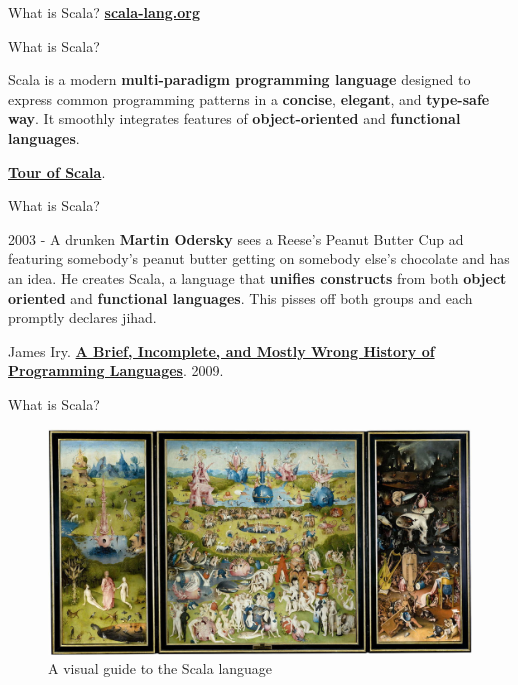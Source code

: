 \documentclass[ignorenonframetext,]{beamer}
\begin{document}
\begin{frame}[fragile]
\begin{block}{What is Scala?}
\href{https://www.scala-lang.org}{\textbf{scala-lang.org}}

\end{block}

\begin{block}{What is Scala?}

Scala is a modern \textbf{multi-paradigm programming language} designed
to express common programming patterns in a \textbf{concise},
\textbf{elegant}, and \textbf{type-safe way}. It smoothly integrates
features of \textbf{object-oriented} and \textbf{functional languages}.

\href{https://docs.scala-lang.org/tour/tour-of-scala.html}{\textbf{Tour
of Scala}}.

\end{block}

\begin{block}{What is Scala?}

2003 - A drunken \textbf{Martin Odersky} sees a Reese's Peanut Butter
Cup ad featuring somebody's peanut butter getting on somebody else's
chocolate and has an idea. He creates Scala, a language that
\textbf{unifies constructs} from both \textbf{object oriented} and
\textbf{functional languages}. This pisses off both groups and each
promptly declares jihad.

James Iry.
\href{http://james-iry.blogspot.com/2009/05/brief-incomplete-and-mostly-wrong.html}{\textbf{A
Brief, Incomplete, and Mostly Wrong History of Programming Languages}}.
2009.

\end{block}

\begin{block}{What is Scala?}

\begin{figure}
\centering
\includegraphics[width=5.20833in]{bosch.jpg}
\caption{A visual guide to the Scala language}
\end{figure}


\end{block}
\end{frame}
\end{document}
